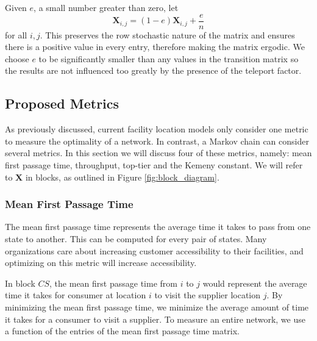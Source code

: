 \documentclass[twoside,twocolumn]{article}
\begin{document}
Given $e$, a small number greater than zero, let
$$\textbf{X}_{i,j} = (1-e) \textbf{X}_{i, j} + \frac{e}{n}$$
for all $i, j$.
This preserves the row stochastic nature of the matrix and ensures there is a positive value in every entry, therefore making the matrix ergodic.
We choose $e$ to be significantly smaller than any values in the transition matrix so the results are not influenced too greatly by the presence of the teleport factor.

\subsection{Proposed Metrics}
\label{sec:proposed_metrics}

As previously discussed, current facility location models only consider one metric to measure the optimality of a network.
In contrast, a Markov chain can consider several metrics.
In this section we will discuss four of these metrics, namely: mean first passage time, throughput, top-tier and the Kemeny constant.
We will refer to $\textbf{X}$ in blocks, as outlined in Figure \ref{fig:block_diagram}.

\subsubsection{Mean First Passage Time}

The mean first passage time represents the average time it takes to pass from one state to another.
This can be computed for every pair of states.
Many organizations care about increasing customer accessibility to their facilities, and optimizing on this metric will increase accessibility.

In block $CS$, the mean first passage time from $i$ to $j$ would represent the average time it takes for consumer at location $i$ to visit the supplier location $j$.
By minimizing the mean first passage time, we minimize the average amount of time it takes for a consumer to visit a supplier.
To measure an entire network, we use a function of the entries of the mean first passage time matrix.
\end{document}
